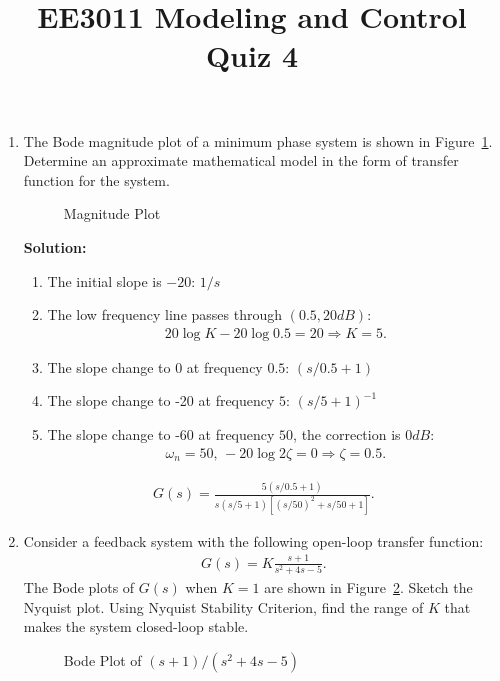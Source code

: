 \documentclass{article}
\title{EE3011 Modeling and Control\\Quiz 4}
\date{}
\newlength\figureheight
\newlength\figurewidth
\newcommand{\tikzdir}[1]{tikz/#1.tikz}
\newcommand{\inputtikz}[1]{}}
\begin{document}
 \maketitle

\begin{enumerate}
\item The Bode magnitude plot of a minimum phase system is shown in Figure~\ref{fig:1}. Determine an approximate mathematical model in the form of transfer function for the system.
  \begin{figure}[ht]
    \setlength\figureheight{8cm}
    \setlength\figurewidth{14cm}
    \centering
    \inputtikz{Quiz21}
    \caption{Magnitude Plot\label{fig:1}}
  \end{figure}

  {\bf Solution:}
  \begin{enumerate}
  \item The initial slope is $-20$: $1/s$
  \item The low frequency line passes through $(0.5,20dB)$:
    \begin{align*}
      20\log K - 20 \log 0.5 = 20\Rightarrow K = 5.
    \end{align*}
  \item The slope change to 0 at frequency $0.5$: $(s/0.5+1)$
  \item The slope change to -20 at frequency $5$: $(s/5+1)^{-1}$
  \item The slope change to -60 at frequency $50$, the correction is $0dB$:
    \begin{align*}
      \omega_n = 50,\,-20\log 2\zeta = 0 \Rightarrow \zeta = 0.5.
    \end{align*}
  \end{enumerate}
\begin{align*}
  G(s) = \frac{5(s/0.5+1)}{s(s/5+1)\left[(s/50)^2+s/50+1\right]}.
\end{align*}

  \newpage
\item Consider a feedback system with the following open-loop transfer function:
  \begin{align*}
    G(s) = K\frac{s+1}{s^2+4s-5}.
  \end{align*}
  The Bode plots of $G(s)$ when $K = 1$ are shown in Figure~\ref{fig:2}. Sketch the Nyquist plot. Using Nyquist Stability Criterion, find the range of $K$ that makes the system closed-loop stable.
  \begin{figure}[ht]
    \setlength\figureheight{4cm}
    \setlength\figurewidth{14cm}
    \centering
    \inputtikz{Quiz22}
    \caption{Bode Plot of $(s+1)/(s^2+4s-5)$\label{fig:2}}
  \end{figure}


\end{enumerate}
\end{document}
